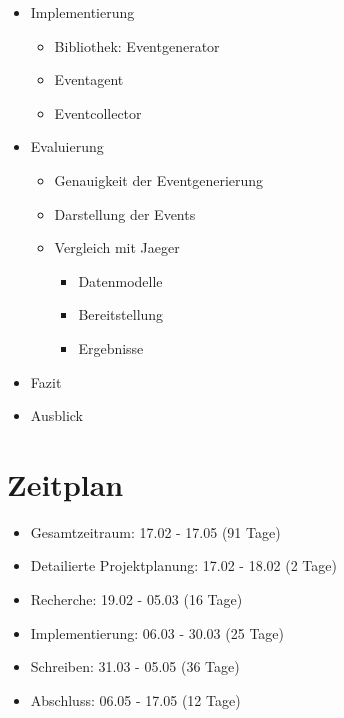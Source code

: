 \documentclass[a4paper]{article}
\begin{document}
\begin{itemize}
\begin{itemize}
\begin{itemize}
		\end{itemize}
	\end{itemize}
	\item Implementierung
	\begin{itemize}
		\item Bibliothek: Eventgenerator
		\item Eventagent
		\item Eventcollector
	\end{itemize}
	\item Evaluierung
	\begin{itemize}
		\item Genauigkeit der Eventgenerierung
		\item Darstellung der Events
		\item Vergleich mit Jaeger
		\begin{itemize}
			\item Datenmodelle
			\item Bereitstellung
			\item Ergebnisse
		\end{itemize}
	\end{itemize}
	\item Fazit
	\item Ausblick
\end{itemize}

\section{Zeitplan}
\begin{itemize}
\item		Gesamtzeitraum: 17.02 - 17.05 (91 Tage)

\item		Detailierte Projektplanung: 17.02 - 18.02 (2 Tage)
\item		Recherche: 19.02 - 05.03 (16 Tage)
\item		Implementierung: 06.03 - 30.03 (25 Tage)
\item		Schreiben:  31.03 - 05.05 (36 Tage)
\item		Abschluss: 06.05 - 17.05 (12 Tage)


\end{itemize}
\newpage
\printbibliography[title=Literaturverzeichnis]
\end{document}

